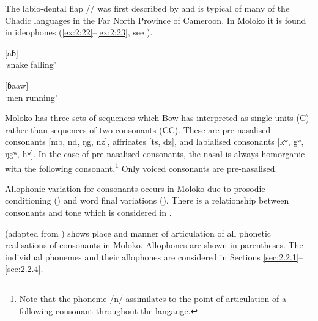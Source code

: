 The labio-dental flap /\dentalflap  / was first described by \citet{OlsonHajek2004} and is typical of many of the Chadic languages in the Far North Province of Cameroon. In Moloko it is found in ideophones (\ref{ex:2:22}--\ref{ex:2:23}, see ). 


\ea \label{ex:2:22}
\textup{[\dentalflap aɓ]}\\
\glt  ‘snake falling’
\z

\ea \label{ex:2:23}
\textup{[ɓa\dentalflap aw]}\\
\glt  ‘men running’ 
\z

Moloko has three sets of sequences which Bow has interpreted as single units (C) rather than sequences of two consonants (CC).  These are pre-nasalised consonants [mb, nd, ŋg, nz], affricates [ts, dz], and labialised consonants [kʷ, gʷ, ŋgʷ, hʷ]. In the case of pre-nasalised consonants, the nasal is always homorganic with the following consonant.\footnote{Note that the phoneme /n/ assimilates to the point of articulation of a following consonant throughout the langauge.} Only voiced consonants are pre-nasalised. 

Allophonic variation for consonants occurs in Moloko due to prosodic conditioning () and word final variations (). There is a relationship between consonants and tone which is considered in .


 (adapted from \citealt{Bow1997c}) shows place and manner of articulation of all phonetic realisations of consonants in Moloko.  Allophones are shown in parentheses. The individual phonemes and their allophones are considered in Sections \ref{sec:2.2.1}--\ref{sec:2.2.4}.


